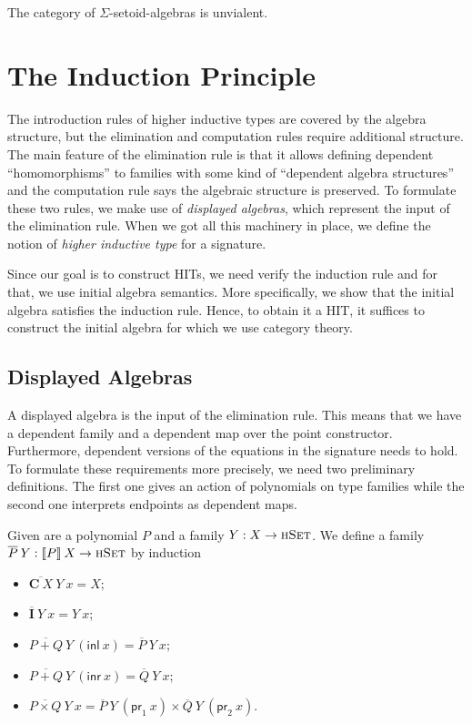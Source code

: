 \documentclass[9pt]{entcs}
\newcommand{\type}[1]{\textsc{#1}}
\newcommand{\term}[1]{\mathsf{#1}}
\newcommand{\constructor}[1]{\mathbf{#1}}
\newcommand{\hset}{\type{hSet}} %
\newcommand{\0}{\textbf{0}} %
\newcommand{\1}{\textbf{1}} %
\newcommand{\inl}{\term{inl}} %
\newcommand{\inr}{\term{inr}} %
\newcommand{\prl}{\term{pr}_1} %
\newcommand{\prr}{\term{pr}_2} %
\newcommand{\C}{\constructor{C}} %
\newcommand{\I}{\constructor{I}} %
\newcommand{\sumP}[2]{#1 + #2} %
\newcommand{\prodP}[2]{#1 \times #2} %
\newcommand{\semP}[1]{\llbracket #1 \rrbracket} %
\newcommand{\polydact}[2]{\overline{#1} \> #2} %
\begin{document}
\begin{proposition}
The category of $\Sigma$-setoid-algebras is unvialent.
\end{proposition}

\section{The Induction Principle}
\label{sec:induction}
The introduction rules of higher inductive types are covered by the algebra structure, but the elimination and computation rules require additional structure.
The main feature of the elimination rule is that it allows defining dependent ``homomorphisms'' to families with some kind of ``dependent algebra structures'' and the computation rule says the algebraic structure is preserved.
To formulate these two rules, we make use of \emph{displayed algebras}, which represent the input of the elimination rule.
When we got all this machinery in place, we define the notion of \emph{higher inductive type} for a signature.

Since our goal is to construct HITs, we need verify the induction rule and for that, we use initial algebra semantics.
More specifically, we show that the initial algebra satisfies the induction rule.
Hence, to obtain it a HIT, it suffices to construct the initial algebra for which we use category theory.

\subsection{Displayed Algebras}
\label{ref:induction}
A displayed algebra is the input of the elimination rule.
This means that we have a dependent family and a dependent map over the point constructor.
Furthermore, dependent versions of the equations in the signature needs to hold.
To formulate these requirements more precisely, we need two preliminary definitions.
The first one gives an action of polynomials on type families while the second one interprets endpoints as dependent maps.

\begin{definition}
Given are a polynomial $P$ and a family $Y : X \rightarrow \hset$.
We define a family $\polydact{P}{Y} : \semP{P} \> X \rightarrow \hset$ by induction
\begin{itemize}
	\item $\polydact{\C \> X}{Y} \> x = X$;
	\item $\polydact{\I}{Y} \> x = Y \> x$;
	\item $\polydact{\sumP{P}{Q}}{Y} \> (\inl \> x) = \polydact{P}{Y} \> x$;
	\item $\polydact{\sumP{P}{Q}}{Y} \> (\inr \> x) = \polydact{Q}{Y} \> x$;
	\item $\polydact{\prodP{P}{Q}}{Y} \> x = \polydact{P}{Y} \> (\prl \> x) \times \polydact{Q}{Y} \> (\prr \> x)$.
\end{itemize}
\end{definition}
\end{document}
